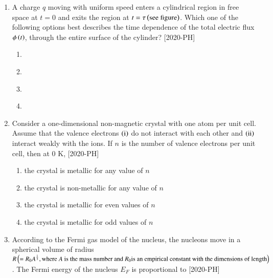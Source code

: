 \documentclass[journal]{IEEEtran}
\begin{document}
\begin{enumerate}[start=40]
\item A charge $q$ moving with uniform speed enters a cylindrical region in free space at $t=0$ and exits the region at $t=\tau \left(\text{see figure}\right)$. Which one of the following options best describes the time dependence of the total electric flux $\phi \left(t\right)$, through the entire surface of the cylinder? \hfill{[2020-PH]}\\
\begin{figure}[H]
			\centering
			
			\label{44}
		\end{figure}
\begin{enumerate}
    \item \begin{figure}[H]
			\centering
			
		\end{figure}
    \item \begin{figure}[H]
			\centering
			
		\end{figure}
    \item \begin{figure}[H]
			\centering
			
		\end{figure}
  \item \begin{figure}[H]
			\centering
			
		\end{figure}
\end{enumerate}
\item Consider a one-dimensional non-magnetic crystal with one atom per unit cell. Assume that the valence electrons $\left(\text{i}\right)$ do not interact with each other and $\left(\text{ii}\right)$ interact weakly with the ions. If $n$ is the number of valence electrons per unit cell, then at $0$ K, \hfill{[2020-PH]}\\
\begin{enumerate}
    \item the crystal is metallic for any value of $n$
    \item the crystal is non-metallic for any value of $n$
    \item the crystal is metallic for even values of $n$
    \item the crystal is metallic for odd values of $n$
\end{enumerate}
\item According to the Fermi gas model of the nucleus, the nucleons move in a spherical volume of radius $R \left(=R_{0}A^\frac{1}{3}, \text{where }A\text{ is the mass number and }R_0\text{is an empirical constant with the dimensions of length}\right)$. The Fermi energy of the nucleus $E_{F}$ is proportional to \hfill{[2020-PH]}\\

\end{enumerate}
\end{document}
